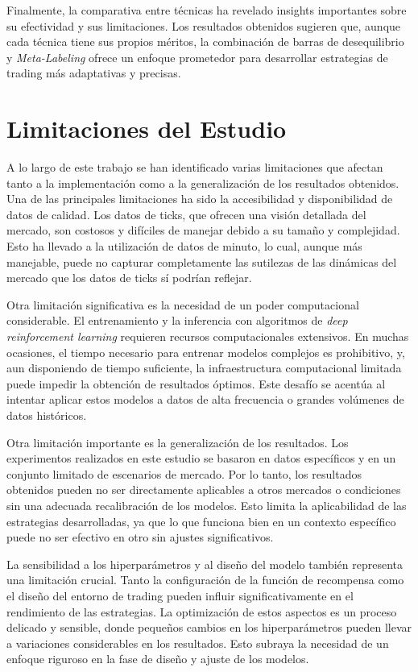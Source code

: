 \documentclass[a4paper,12pt, twoside]{report}
\begin{document}
Finalmente, la comparativa entre técnicas ha revelado insights importantes sobre su 
efectividad y sus limitaciones. Los resultados obtenidos sugieren que, aunque cada 
técnica tiene sus propios méritos, la combinación de barras de desequilibrio y 
\textit{Meta-Labeling} ofrece un enfoque prometedor para desarrollar estrategias de 
trading más adaptativas y precisas.


\section{Limitaciones del Estudio}

A lo largo de este trabajo se han identificado varias limitaciones que afectan tanto a 
la implementación como a la generalización de los resultados obtenidos. Una de las 
principales limitaciones ha sido la accesibilidad y disponibilidad de datos de calidad. 
Los datos de ticks, que ofrecen una visión detallada del mercado, son costosos y difíciles 
de manejar debido a su tamaño y complejidad. Esto ha llevado a la utilización de datos de
 minuto, lo cual, aunque más manejable, puede no capturar completamente las sutilezas de 
 las dinámicas del mercado que los datos de ticks sí podrían reflejar.

Otra limitación significativa es la necesidad de un poder computacional considerable. El 
entrenamiento y la inferencia con algoritmos de \textit{deep reinforcement learning} 
requieren recursos computacionales extensivos. En muchas ocasiones, el tiempo necesario 
para entrenar modelos complejos es prohibitivo, y, aun disponiendo de tiempo suficiente, 
la infraestructura computacional limitada puede impedir la obtención de resultados óptimos. 
Este desafío se acentúa al intentar aplicar estos modelos a datos de alta frecuencia o 
grandes volúmenes de datos históricos.

Otra limitación importante es la generalización de los resultados. Los experimentos 
realizados en este estudio se basaron en datos específicos y en un conjunto limitado de 
escenarios de mercado. Por lo tanto, los resultados obtenidos pueden no ser directamente 
aplicables a otros mercados o condiciones sin una adecuada recalibración de los modelos. 
Esto limita la aplicabilidad de las estrategias desarrolladas, ya que lo que funciona bien 
en un contexto específico puede no ser efectivo en otro sin ajustes significativos.

La sensibilidad a los hiperparámetros y al diseño del modelo también representa una 
limitación crucial. Tanto la configuración de la función de recompensa como el diseño
 del entorno de trading pueden influir significativamente en el rendimiento de las 
 estrategias. La optimización de estos aspectos es un proceso delicado y sensible, 
 donde pequeños cambios en los hiperparámetros pueden llevar a variaciones considerables 
 en los resultados. Esto subraya la necesidad de un enfoque riguroso en la fase de diseño
  y ajuste de los modelos.
\end{document}
